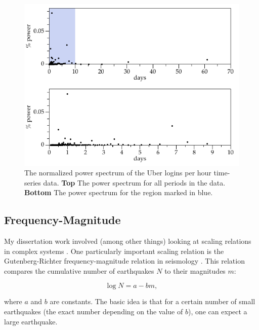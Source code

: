 \documentclass{tufte-handout}
\begin{document}
\begin{figure}[h]
	\includegraphics[width=\linewidth]{fft.pdf}%
	\caption{The normalized power spectrum of the Uber logins per hour time-series data. {\bf Top} The power spectrum for all periods in the data. {\bf Bottom} The power spectrum for the region marked in blue.}%
	\label{fig:fft}%
\end{figure}

\subsection{Frequency-Magnitude}

My dissertation work involved (among other things) looking at scaling relations in complex systems \citep{SachsYTRM12}. One particularly important scaling relation is the Gutenberg-Richter frequency-magnitude relation in seismology \citep{GutenbergR54}. This relation compares the cumulative number of earthquakes $N$ to their magnitudes $m$:

\begin{equation}
        \log N = a - b m
        \label{eq:gr},
\end{equation}

\noindent where $a$ and $b$ are constants. The basic idea is that for a certain number of small earthquakes (the exact number depending on the value of $b$), one can expect a large earthquake.
\end{document}
